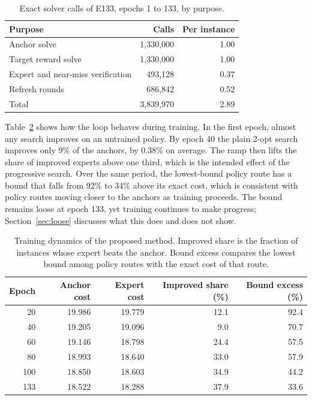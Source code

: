 \documentclass[preprint,12pt,authoryear]{elsarticle}
\begin{document}
\begin{table}[t]
\centering
\caption{Exact solver calls of E133, epochs 1 to 133, by purpose.}
\label{tab:calls}
\small
\begin{tabular}{lrr}
\toprule
Purpose & Calls & Per instance \\
\midrule
Anchor solve & 1,330,000 & 1.00 \\
Target reward solve & 1,330,000 & 1.00 \\
Expert and near-miss verification & 493,128 & 0.37 \\
Refresh rounds & 686,842 & 0.52 \\
Total & 3,839,970 & 2.89 \\
\bottomrule
\end{tabular}
\end{table}

Table~\ref{tab:dynamics} shows how the loop behaves during training. In the first epoch, almost any search improves on an untrained policy. By epoch 40 the plain 2-opt search improves only 9\% of the anchors, by 0.38\% on average. The ramp then lifts the share of improved experts above one third, which is the intended effect of the progressive search. Over the same period, the lowest-bound policy route has a bound that falls from 92\% to 34\% above its exact cost, which is consistent with policy routes moving closer to the anchors as training proceeds. The bound remains loose at epoch 133, yet training continues to make progress; Section~\ref{sec:loose} discusses what this does and does not show.

\begin{table}[t]
\centering
\caption{Training dynamics of the proposed method. Improved share is the fraction of instances whose expert beats the anchor. Bound excess compares the lowest bound among policy routes with the exact cost of that route.}
\label{tab:dynamics}
\small
\begin{tabular}{rrrrr}
\toprule
Epoch & Anchor cost & Expert cost & Improved share (\%) & Bound excess (\%) \\
\midrule
20 & 19.986 & 19.779 & 12.1 & 92.4 \\
40 & 19.205 & 19.096 & 9.0 & 70.7 \\
60 & 19.146 & 18.798 & 24.4 & 57.5 \\
80 & 18.993 & 18.640 & 33.0 & 57.9 \\
100 & 18.850 & 18.603 & 34.9 & 44.2 \\
133 & 18.522 & 18.288 & 37.9 & 33.6 \\
\bottomrule
\end{tabular}
\end{table}
\end{document}
